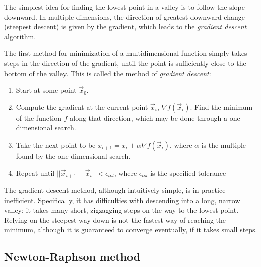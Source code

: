 \documentclass[
  letterpaper,
  DIV=11,
  numbers=noendperiod]{scrreprt}
\begin{document}
The simplest idea for finding the lowest point in a valley is to follow
the slope downward. In multiple dimensions, the direction of greatest
downward change (steepest descent) is given by the gradient, which leads
to the \emph{gradient descent} algorithm.

The first method for minimization of a multidimensional function simply
takes steps in the direction of the gradient, until the point is
sufficiently close to the bottom of the valley. This is called the
method of \emph{gradient descent}:

\begin{tcolorbox}[enhanced jigsaw, colback=white, coltitle=black, bottomrule=.15mm, breakable, bottomtitle=1mm, titlerule=0mm, arc=.35mm, leftrule=.75mm, title=\textcolor{quarto-callout-note-color}{\faInfo}\hspace{0.5em}{Gradient descent algorithm}, colbacktitle=quarto-callout-note-color!10!white, toprule=.15mm, toptitle=1mm, opacitybacktitle=0.6, rightrule=.15mm, left=2mm, colframe=quarto-callout-note-color-frame, opacityback=0]

\begin{enumerate}
\def\labelenumi{\arabic{enumi}.}
\item
  Start at some point \(\vec x_0\).
\item
  Compute the gradient at the current point \(\vec x_i\),
  \(\nabla f (\vec x_i)\). Find the minimum of the function \(f\) along
  that direction, which may be done through a one-dimensional search.
\item
  Take the next point to be
  \(x_{i+1} = x_i + \alpha \nabla f (\vec x_i)\), where \(\alpha\) is
  the multiple found by the one-dimensional search.
\item
  Repeat until \(|| \vec x_{i+1} - \vec x_i || < \epsilon_{tol}\), where
  \(\epsilon_{tol}\) is the specified tolerance
\end{enumerate}

\end{tcolorbox}

The gradient descent method, although intuitively simple, is in practice
inefficient. Specifically, it has difficulties with descending into a
long, narrow valley: it takes many short, zigzagging steps on the way to
the lowest point. Relying on the steepest way down is not the fastest
way of reaching the minimum, although it is guaranteed to converge
eventually, if it takes small steps.

\subsection{Newton-Raphson method}\label{newton-raphson-method-1}
\end{document}
